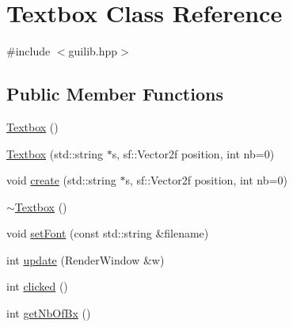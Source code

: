 \hypertarget{class_textbox}{}\section{Textbox Class Reference}
\label{class_textbox}


{\ttfamily \#include $<$guilib.\+hpp$>$}

\subsection*{Public Member Functions}
\begin{DoxyCompactItemize}
\item 
\hyperlink{class_textbox_a72ae249fb4c23d134f7bc91296de0942}{Textbox} ()
\item 
\hyperlink{class_textbox_a3012a48f019d162a425c789861bb1990}{Textbox} (std\+::string $\ast$s, sf\+::\+Vector2f position, int nb=0)
\item 
void \hyperlink{class_textbox_a0041248c755db7199af083f72eff1450}{create} (std\+::string $\ast$s, sf\+::\+Vector2f position, int nb=0)
\item 
\hyperlink{class_textbox_a3691c8a226ec90cada4c36466a940ba2}{$\sim$\+Textbox} ()
\item 
void \hyperlink{class_textbox_ab9621713182598984ad3fb859d0e1d9f}{set\+Font} (const std\+::string \&filename)
\item 
int \hyperlink{class_textbox_acde79fe8b1e486111d64ee8867c7acc7}{update} (Render\+Window \&w)
\item 
int \hyperlink{class_textbox_a1e22453d60cefece0d06a92aa257c438}{clicked} ()
\item 
int \hyperlink{class_textbox_abe733f2845e2d532a0a364517ff00ba2}{get\+Nb\+Of\+Bx} ()
\end{DoxyCompactItemize}
